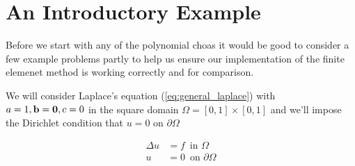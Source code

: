 \chapter{An Introductory Example}

Before we start with any of the polynomial choas it would be good to consider a
few example problems partly to help us ensure our implementation of the finite
elemenet method is working correctly and for comparison.

We will consider Laplace's equation (\ref{eq:general_laplace}) with $a = 1, \mathbf{b}
= \mathbf{0}, c = 0$ in the square domain $\Omega = [0, 1] \times [0, 1]$ and we'll
impose the Dirichlet condition that $u = 0$ on $\partial\Omega$

\begin{center}
\end{center}

\begin{align*}
    \Delta u &= f\, \text{ in $\Omega$} \\
           u &= 0\, \text{ on $\partial\Omega$}
\end{align*}

